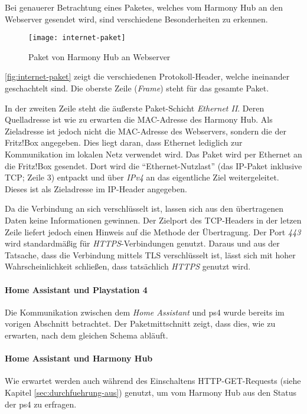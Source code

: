 Bei genauerer Betrachtung eines Paketes, welches vom Harmony Hub an den Webserver gesendet wird,
sind verschiedene Besonderheiten zu erkennen.

\begin{figure}[h!]
    \centering
    \texttt{[image: internet-paket]}
    \caption{Paket von Harmony Hub an Webserver}\label{fig:internet-paket}
\end{figure}


\autoref{fig:internet-paket} zeigt die verschiedenen Protokoll-Header, welche ineinander geschachtelt sind.
Die oberste Zeile (\textit{Frame}) steht für das gesamte Paket.

In der zweiten Zeile steht die äußerste Paket-Schicht \textit{Ethernet II}.
Deren Quelladresse ist wie zu erwarten die MAC-Adresse des Harmony Hub.
Als Zieladresse ist jedoch nicht die MAC-Adresse des Webservers,
sondern die der Fritz!Box angegeben.
Dies liegt daran, dass Ethernet lediglich zur Kommunikation im lokalen Netz verwendet wird.
Das Paket wird per Ethernet an die Fritz!Box gesendet.
Dort wird die \enquote{Ethernet-Nutzlast} (das IP-Paket inklusive TCP; Zeile 3) entpackt und über \textit{IPv4} an das eigentliche Ziel weitergeleitet.
Dieses ist als Zieladresse im IP-Header angegeben.

Da die Verbindung an sich verschlüsselt ist, lassen sich aus den übertragenen Daten keine Informationen gewinnen.
Der Zielport des TCP-Headers in der letzen Zeile liefert jedoch einen Hinweis auf die Methode der Übertragung.
Der Port \textit{443} wird standardmäßig für \textit{HTTPS}-Verbindungen genutzt.
Daraus und aus der Tatsache, dass die Verbindung mittels TLS verschlüsselt ist,
lässt sich mit hoher Wahrscheinlichkeit schließen, dass tatsächlich \textit{HTTPS} genutzt wird.

\newpage

\paragraph{Home Assistant und Playstation 4}
Die Kommunikation zwischen dem \textit{Home Assistant} und \ac{ps4} wurde bereits im vorigen Abschnitt betrachtet.
Der Paketmittschnitt zeigt, dass dies, wie zu erwarten, nach dem gleichen Schema abläuft.

\paragraph{Home Assistant und Harmony Hub}
Wie erwartet werden auch während des Einschaltens HTTP-GET-Requests (siehe Kapitel \ref{sec:durchfuehrung-aus}) genutzt,
um vom Harmony Hub aus den Status der \ac{ps4} zu erfragen.

